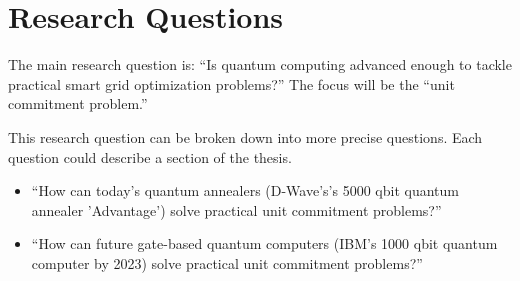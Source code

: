 \section{Research Questions}

The main research question is:
``Is quantum computing advanced enough to tackle practical
smart grid optimization problems?''
The focus will be the ``unit commitment problem.''

This research question can be broken down into more precise questions.
Each question could describe a section of the thesis.
\begin{itemize}
  \item ``How can today's quantum annealers (D-Wave's's 5000 qbit quantum annealer 'Advantage') solve practical unit commitment problems?''
  \item ``How can future gate-based quantum computers (IBM's 1000 qbit quantum computer by 2023) solve practical unit commitment problems?''
\end{itemize}